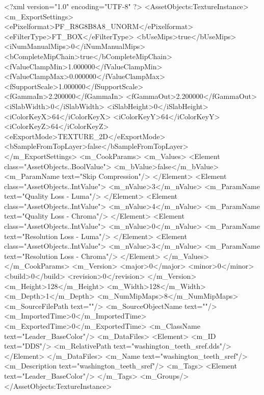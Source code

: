 <?xml version="1.0" encoding="UTF-8" ?>
<AssetObjects:TextureInstance>
<m_ExportSettings>
<ePixelformat>PF_R8G8B8A8_UNORM</ePixelformat>
<eFilterType>FT_BOX</eFilterType>
<bUseMips>true</bUseMips>
<iNumManualMips>0</iNumManualMips>
<bCompleteMipChain>true</bCompleteMipChain>
<fValueClampMin>1.000000</fValueClampMin>
<fValueClampMax>0.000000</fValueClampMax>
<fSupportScale>1.000000</fSupportScale>
<fGammaIn>2.200000</fGammaIn>
<fGammaOut>2.200000</fGammaOut>
<iSlabWidth>0</iSlabWidth>
<iSlabHeight>0</iSlabHeight>
<iColorKeyX>64</iColorKeyX>
<iColorKeyY>64</iColorKeyY>
<iColorKeyZ>64</iColorKeyZ>
<eExportMode>TEXTURE_2D</eExportMode>
<bSampleFromTopLayer>false</bSampleFromTopLayer>
</m_ExportSettings>
<m_CookParams>
<m_Values>
<Element class="AssetObjects..BoolValue">
<m_bValue>false</m_bValue>
<m_ParamName text="Skip Compression"/>
</Element>
<Element class="AssetObjects..IntValue">
<m_nValue>3</m_nValue>
<m_ParamName text="Quality Loss - Luma"/>
</Element>
<Element class="AssetObjects..IntValue">
<m_nValue>4</m_nValue>
<m_ParamName text="Quality Loss - Chroma"/>
</Element>
<Element class="AssetObjects..IntValue">
<m_nValue>0</m_nValue>
<m_ParamName text="Resolution Loss - Luma"/>
</Element>
<Element class="AssetObjects..IntValue">
<m_nValue>3</m_nValue>
<m_ParamName text="Resolution Loss - Chroma"/>
</Element>
</m_Values>
</m_CookParams>
<m_Version>
<major>0</major>
<minor>0</minor>
<build>0</build>
<revision>0</revision>
</m_Version>
<m_Height>128</m_Height>
<m_Width>128</m_Width>
<m_Depth>1</m_Depth>
<m_NumMipMaps>8</m_NumMipMaps>
<m_SourceFilePath text=""/>
<m_SourceObjectName text=""/>
<m_ImportedTime>0</m_ImportedTime>
<m_ExportedTime>0</m_ExportedTime>
<m_ClassName text="Leader_BaseColor"/>
<m_DataFiles>
<Element>
<m_ID text="DDS"/>
<m_RelativePath text="washington_teeth_sref.dds"/>
</Element>
</m_DataFiles>
<m_Name text="washington_teeth_sref"/>
<m_Description text="washington_teeth_sref"/>
<m_Tags>
<Element text="Leader_BaseColor"/>
</m_Tags>
<m_Groups/>
</AssetObjects:TextureInstance>
